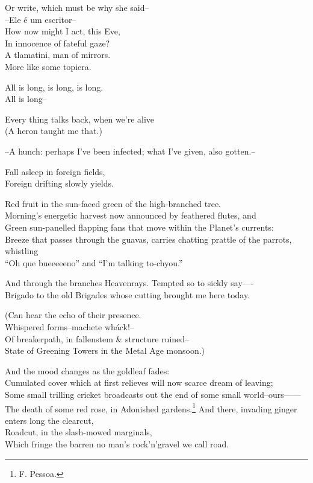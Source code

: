 Or write, which must be why she said-- \\
--Ele é um escritor-- \\
How now might I act, this Eve, \\
In innocence of fateful gaze? \\
A tlamatini, man of mirrors. \\
More like some topiera.
 
\secdiv

All is long, is long, is long. \\
All is long--

Every thing talks back, when we're alive \\
(A heron taught me that.)

--A hunch: perhaps I've been infected; what I've given, also gotten.--

Fall asleep in foreign fields, \\
Foreign drifting slowly yields.

Red fruit in the sun-faced green of the high-branched tree. \\
Morning's energetic harvest now announced by feathered flutes, and \\
Green sun-panelled flapping fans that move within the Planet's currents: \\
Breeze that passes through the guavas, carries chatting prattle of the parrots, whistling \\
``Oh que bueeeeeno'' and ``I'm talking to-chyou.''

And through the branches Heavenrays. Tempted so to sickly say—- \\
Brigado to the old Brigades whose cutting brought me here today. 

(Can hear the echo of their presence. \\
Whispered forms--machete wháck!-- \\
Of breakerpath, in fallenstem \& structure ruined-- \\
State of Greening Towers in the Metal Age monsoon.)

And the mood changes as the goldleaf fades: \\
Cumulated cover which at first relieves will now scarce dream of leaving; \\
Some small trilling cricket broadcasts out the end of some small world--ours—— \\
The death of some red rose, in Adonished gardens.\footnote{F. Pessoa.}
And there, invading ginger enters long the clearcut, \\
Roadcut, in the slash-mowed marginals, \\
Which fringe the barren no man's rock'n'gravel we call road. 

